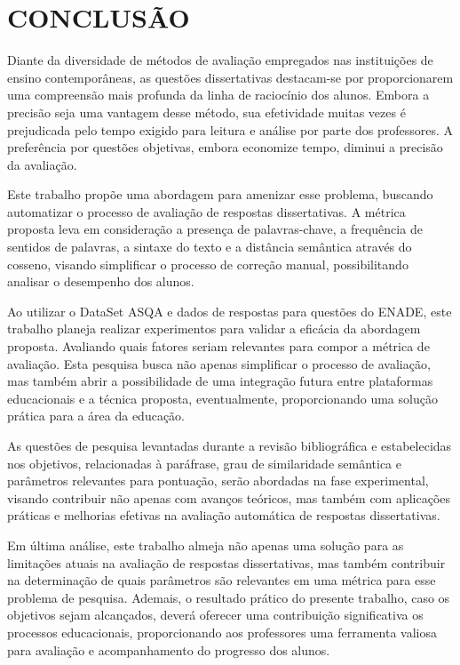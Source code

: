 \chapter{CONCLUSÃO}

Diante da diversidade de métodos de avaliação empregados nas instituições de ensino contemporâneas, as questões dissertativas destacam-se por proporcionarem uma compreensão mais profunda da linha de raciocínio dos alunos. Embora a precisão seja uma vantagem desse método, sua efetividade muitas vezes é prejudicada pelo tempo exigido para leitura e análise por parte dos professores. A preferência por questões objetivas, embora economize tempo, diminui a precisão da avaliação.

Este trabalho propõe uma abordagem para amenizar esse problema, buscando automatizar o processo de avaliação de respostas dissertativas. A métrica proposta leva em consideração a presença de palavras-chave, a frequência de sentidos de palavras, a sintaxe do texto e a distância semântica através do cosseno, visando simplificar o processo de correção manual, possibilitando analisar o desempenho dos alunos.

Ao utilizar o DataSet ASQA e dados de respostas para questões do ENADE, este trabalho planeja realizar experimentos para validar a eficácia da abordagem proposta. Avaliando quais fatores seriam relevantes para compor a métrica de avaliação. Esta pesquisa busca não apenas simplificar o processo de avaliação, mas também abrir a possibilidade de uma integração futura entre plataformas educacionais e a técnica proposta, eventualmente, proporcionando uma solução prática para a área da educação.

As questões de pesquisa levantadas durante a revisão bibliográfica e estabelecidas nos objetivos, relacionadas à paráfrase, grau de similaridade semântica e parâmetros relevantes para pontuação, serão abordadas na fase experimental, visando contribuir não apenas com avanços teóricos, mas também com aplicações práticas e melhorias efetivas na avaliação automática de respostas dissertativas.

Em última análise, este trabalho almeja não apenas uma solução para as limitações atuais na avaliação de respostas dissertativas, mas também contribuir na determinação de quais parâmetros são relevantes em uma métrica para esse problema de pesquisa. Ademais, o resultado prático do presente trabalho, caso os objetivos sejam alcançados, deverá oferecer uma contribuição significativa os processos educacionais, proporcionando aos professores uma ferramenta valiosa para avaliação e acompanhamento do progresso dos alunos.